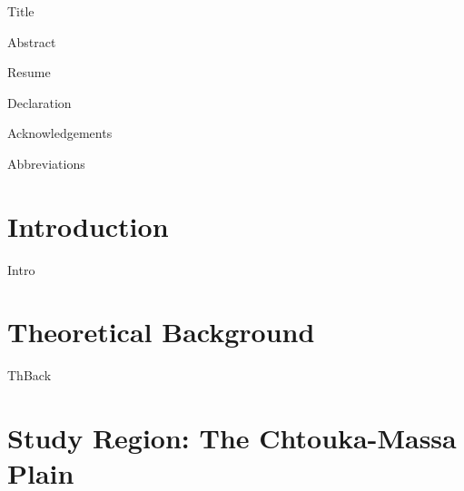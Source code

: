 \documentclass[a4paper, 12pt, bibliography=totoc, parskip=half, numbers=noenddot, twoside=true, open=right,headings=twolinechapter]{scrreprt}
\begin{document}
{Title}

\newpage
\thispagestyle{empty}
\mbox{}



\newpage
{Abstract}

\newpage
\thispagestyle{empty}
\mbox{}

\newpage
{Resume}

\newpage
{Declaration}

\newpage
\thispagestyle{empty}
\mbox{}

\newpage
{Acknowledgements}


\newpage
\thispagestyle{empty}
\mbox{}

\newpage
{}
\tableofcontents
\newpage

\listoffigures
{}
\listoftables

\newpage
{}
{Abbreviations}




\chapter{Introduction}
\label{Chap-Intro}

{Intro}

\chapter{Theoretical Background}
\label{Chap-TheoBack}

{ThBack}

\chapter{Study Region: The Chtouka-Massa Plain}
\label{Chap-MatMeth}
\end{document}
